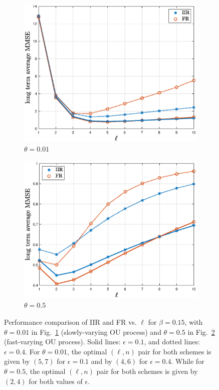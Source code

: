 \documentclass[12pt,journal,onecolumn]{IEEEtran}
\begin{document}
\begin{figure}[t]
\begin{subfigure}{.5\textwidth}
\center
\includegraphics[scale=.4]{iir_and_fr_vs_ell_theta_01_beta_15_eps_1_4}
\caption{$\theta=0.01$}
\label{fig_iir_and_fr_vs_ell_theta_01_beta_15_eps_1_4}
\end{subfigure}
\begin{subfigure}{.5\textwidth}
\center
\includegraphics[scale=.4]{iir_and_fr_vs_ell_theta_5_beta_15_eps_1_4}
\caption{$\theta=0.5$}
\label{fig_iir_and_fr_vs_ell_theta_5_beta_15_eps_1_4}
\end{subfigure}
\caption{Performance comparison of IIR and FR vs. $\ell$ for $\beta=0.15$, with $\theta=0.01$ in Fig.~\ref{fig_iir_and_fr_vs_ell_theta_01_beta_15_eps_1_4} (slowly-varying OU process) and $\theta=0.5$ in Fig.~\ref{fig_iir_and_fr_vs_ell_theta_5_beta_15_eps_1_4} (fast-varying OU process). Solid lines: $\epsilon=0.1$, and dotted lines: $\epsilon=0.4$. For $\theta=0.01$, the optimal $(\ell,n)$ pair for both schemes is given by $(5,7)$ for $\epsilon=0.1$ and by $(4,6)$ for $\epsilon=0.4$. While for $\theta=0.5$, the optimal $(\ell,n)$ pair for both schemes is given by $(2,4)$ for both values of $\epsilon$.}
\label{fig_iir_and_fr_vs_ell_beta_15_eps_1_4}
\end{figure}
\end{document}
